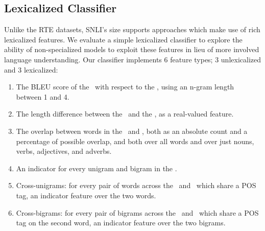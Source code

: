 \subsection{Lexicalized Classifier}
Unlike the RTE datasets, SNLI's size supports approaches which make use of rich lexicalized features.
We evaluate a simple lexicalized classifier to explore the ability of non-specialized models to exploit these features in lieu of more involved language understanding.
Our classifier implements 6 feature types; 3 unlexicalized and 3 lexicalized:
\begin{enumerate}
\setlength\itemsep{-0.25em}
  \item The BLEU score of the \hypothesis\ with respect
  to the \premise, using an n-gram length between 1 and 4.

  \item The length difference between the \hypothesis\ and the \premise, as a real-valued
  feature.

  \item The overlap between words in the \premise\ and \hypothesis,
  both as an absolute count and a percentage of possible overlap, and both over 
  all words and over just nouns, verbs, adjectives, 
  and adverbs.
  
  \item\label{lst:ngram} An indicator for every unigram and bigram in the \hypothesis.

  \item\label{lst:unigram} Cross-unigrams: for every pair of words across the \premise\ and \hypothesis\ which share a 
  POS tag, an indicator feature over the two words.
  
  \item\label{lst:bigram} Cross-bigrams: for every pair of bigrams across the \premise\ and \hypothesis\ which share a 
  POS tag on the second word, an indicator feature over the two bigrams.
\end{enumerate}

%
%


